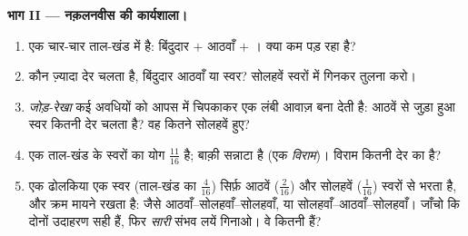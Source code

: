 \begin{problem}
\medskip
\noindent\textbf{भाग II --- नक़लनवीस की कार्यशाला।}
\begin{enumerate}[resume]
  \item एक चार-चार ताल-खंड में है: बिंदुदार  $+$ आठवाँ $+$
        । क्या कम पड़ रहा है?
  \item कौन ज़्यादा देर चलता है, बिंदुदार आठवाँ या  स्वर?
        सोलहवें स्वरों में गिनकर तुलना करो।
  \item \emph{जोड़-रेखा} कई अवधियों को आपस में चिपकाकर एक लंबी
        आवाज़ बना देती है: आठवें से जुड़ा हुआ  स्वर कितनी देर
        चलता है? वह कितने सोलहवें हुए?
  \item एक ताल-खंड के स्वरों का योग $\frac{11}{16}$ है; बाक़ी
        सन्नाटा है (एक \emph{विराम})। विराम कितनी देर का है?
  \item एक ढोलकिया एक  स्वर (ताल-खंड का $\frac{4}{16}$)
        सिर्फ़ आठवें ($\frac{2}{16}$) और सोलहवें ($\frac{1}{16}$)
        स्वरों से भरता है, और क्रम मायने रखता है: जैसे
        आठवाँ--सोलहवाँ--सोलहवाँ, या सोलहवाँ--आठवाँ--सोलहवाँ।
        जाँचो कि दोनों उदाहरण सही हैं, फिर \emph{सारी} संभव लयें
        गिनाओ। वे कितनी हैं?
\end{enumerate}


\end{problem}
